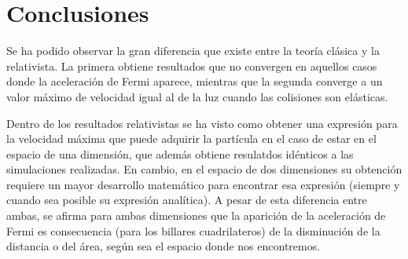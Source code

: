 %
%

\chapter{Conclusiones}

Se ha podido observar la gran diferencia que existe entre la teoría clásica y la relativista. La primera obtiene resultados que no convergen en aquellos casos donde la aceleración de Fermi aparece, mientras que la segunda converge a un valor máximo de velocidad igual al de la luz cuando las colisiones son elásticas. 

\vspace{3mm}

Dentro de los resultados relativistas se ha visto como obtener una expresión para la velocidad máxima que puede adquirir la partícula en el caso de estar en el espacio de una dimensión, que además obtiene resulatdos idénticos a las simulaciones realizadas. En cambio, en el espacio de dos dimensiones su obtención requiere un mayor desarrollo matemático para encontrar esa expresión (siempre y cuando sea posible su expresión analítica). A pesar de esta diferencia entre ambas, se afirma para ambas dimensiones que la aparición de la aceleración de Fermi es consecuencia (para los billares cuadrilateros) de la disminución de la distancia o del área, según sea el espacio donde nos encontremos. 

%